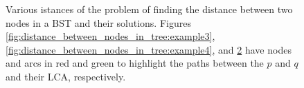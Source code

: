 \begin{figure}
\begin{subfigure}[b]{0.3\textwidth}
		\caption{}
		\label{fig:distance_between_nodes_in_tree:example5}
	\end{subfigure}
	\caption{Various istances of the problem of finding the distance between two nodes in a BST and
	their solutions. Figures \ref{fig:distance_between_nodes_in_tree:example3},
	\ref{fig:distance_between_nodes_in_tree:example4}, and
	\ref{fig:distance_between_nodes_in_tree:example5} have nodes and arcs in red and green to
	highlight the paths between the $p$ and $q$ and their LCA, respectively.}
\end{figure}


\begin{minipage}{\linewidth}
	
\end{minipage}

